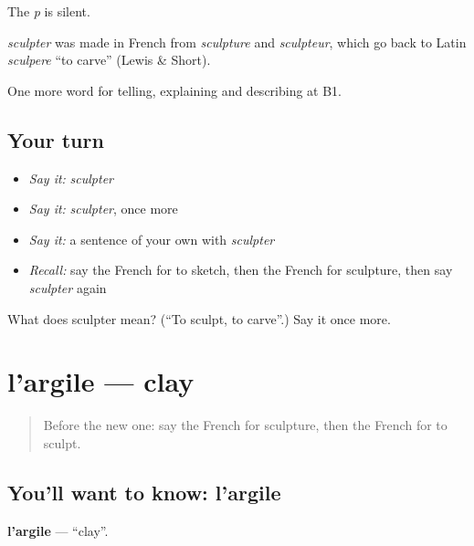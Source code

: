 The \emph{p} is silent.

\begin{cousinweb}
\emph{sculpter} was made in French from \emph{sculpture} and \emph{sculpteur}, which go back to Latin \emph{sculpere} \textquotedblleft{}to carve\textquotedblright{} (Lewis \& Short).
\end{cousinweb}

\begin{grammarlens}[title={What you've built}]
One more word for telling, explaining and describing at B1.
\end{grammarlens}

\subsection*{Your turn}
\begin{itemize}
\raggedright
  \item \emph{Say it:} \emph{sculpter}
  \item \emph{Say it:} \emph{sculpter}, once more
  \item \emph{Say it:} a sentence of your own with \emph{sculpter}
  \item \emph{Recall:} say the French for to sketch, then the French for sculpture, then say \emph{sculpter} again
\end{itemize}

\begin{tcolorbox}[breakable,colback=teal!4,colframe=teal!35!black,title={Before you move on}]
What does sculpter mean? (\textquotedblleft{}To sculpt, to carve\textquotedblright{}.) Say it once more.
\end{tcolorbox}
\section[l'argile]{l'argile — clay}

\label{lesson:FR-C517-argile}



\begin{quote}
Before the new one: say the French for sculpture, then the French for to sculpt.
\end{quote}

\subsection*{You'll want to know: l'argile}
\textbf{l'argile} — \textquotedblleft{}clay\textquotedblright{}.

